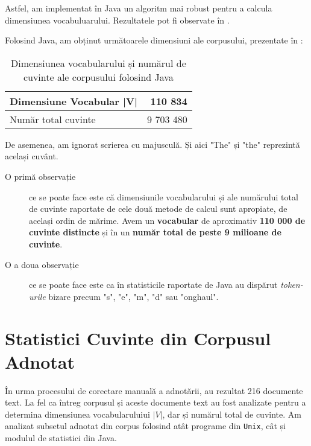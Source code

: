 Astfel, am implementat în Java un algoritm mai robust pentru a calcula dimensiunea vocabuluarului. Rezultatele pot fi observate în .

Folosind Java, am obținut următoarele dimensiuni ale corpusului, prezentate în :

\begin{center}
\begin{table}[htb]
  \caption{Dimensiunea vocabularului și numărul de cuvinte ale corpusului folosind Java}
  \begin{tabular}{|l|r|}
    \hline
    Dimensiune Vocabular |V| & 110 834\\
    \hline
    Număr total cuvinte & 9 703 480 \\
     \hline
  \end{tabular}
  \label{table:vocabulary-size-java}
\end{table}
\end{center}

\lstset{language=make}
\lstset{caption=Cele mai folosite cuvinte din limba engleză pentru corpusul obținut folosind Java, label=lst:top-words-java}


De asemenea, am ignorat scrierea cu majusculă. Și aici "The" și "the" reprezintă același cuvânt.

\begin{description}
	\item[O primă observație] ce se poate face este că dimensiunile vocabularului și ale numărului total de cuvinte raportate de cele două metode de calcul sunt apropiate, de același ordin de mărime. Avem un \textbf{vocabular} de aproximativ \textbf{110 000 de cuvinte distincte} și în un\textbf{ număr total de peste 9 milioane de cuvinte}.
	\item [O a doua observație] ce se poate face este ca în statisticile raportate de Java au dispărut \textit{token-urile} bizare precum "s", "e", "m", "d" sau "onghaul".
\end{description}

\section{Statistici Cuvinte din Corpusul Adnotat}

În urma procesului de corectare manuală a adnotării, au rezultat 216 documente text. La fel ca întreg corpusul și aceste documente text au fost analizate pentru a determina dimensiunea vocabularuluiui $|V|$, dar și numărul total de cuvinte. Am analizat subsetul adnotat din corpus folosind atât programe din \texttt{Unix}, cât și modulul de statistici din Java.


